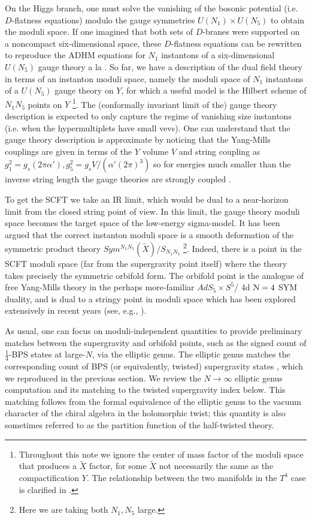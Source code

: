 \documentclass[../main.tex]{subfiles}
\begin{document}
On the Higgs branch, one must solve the vanishing of the bosonic potential (i.e. $D$-flatness equations) modulo the gauge symmetries $U(N_1)\times U(N_5)$ to obtain the moduli space. 
If one imagined that both sets of $D$-branes were supported on a noncompact six-dimensional space, these $D$-flatness equations can be rewritten to reproduce the ADHM equations for $N_1$ instantons of a six-dimensional $U(N_5)$ gauge theory a la \cite{WittenADHM}. So far, we have a description of the dual field theory in terms of an instanton moduli space, namely the moduli space of $N_1$ instantons of a $U(N_5)$ gauge theory on $Y$, for which a useful model is the Hilbert scheme of $N_1 N_5$ points on $Y$ \footnote{Throughout this note we ignore the center of mass factor of the moduli space that produces a $\tilde{X}$ factor, for some $\tilde{X}$ not necessarily the same as the compactification $Y$. The relationship between the two manifolds in the $T^4$ case is clarified in \cite{GiveonKutasovSeiberg}.}. The (conformally invariant limit of the) gauge theory description is expected to only capture the regime of vanishing size instantons (i.e. when the hypermultiplets have small vevs). One can understand that the gauge theory description is approximate by noticing that the Yang-Mills couplings are given in terms of the $Y$ volume $V$ and string coupling as $g_1^2 = g_s (2 \pi \alpha'), g_5^2 = g_s V/(\alpha' (2\pi)^3)$ so for energies much smaller than the inverse string length the gauge theories are strongly coupled \cite{Davidetal}. 


To get the SCFT we take an IR limit, which would be dual to a near-horizon limit from the closed string point of view. In this limit, the gauge theory moduli space becomes the target space of the low-energy sigma-model. It has been argued that the correct instanton moduli space is a smooth deformation of the symmetric product theory $Sym^{N_1 N_5}(\tilde{X})/S_{N_1 N_5}$ \footnote{Here we are taking both $N_1, N_5$ large.}. Indeed, there is a point in the SCFT moduli space (far from the supergravity point itself) where the theory takes precisely the symmetric orbifold form. The orbifold point is the analogue of free Yang-Mills theory in the perhaps more-familiar $AdS_5\times S^5$/ 4d $\mathcal N =4$ SYM duality, and is dual to a stringy point in moduli space which has been explored extensively in recent years (see, e.g., \cite{Eberhardt:2021vsx, Eberhardt:2019ywk, Eberhardt:2018ouy}).

As usual, one can focus on moduli-independent quantities to provide preliminary matches between the supergravity and orbifold points, such as the signed count of $\frac14$-BPS states at large-$N$, via the elliptic genus. The elliptic genus matches the corresponding count of BPS (or equivalently, twisted) supergravity states \cite{deBoerEG}, which we reproduced in the previous section. We review the $N\to \infty$ elliptic genus computation and its matching to the twisted supergravity index below. This matching follows from the formal equivalence of the elliptic genus to the vacuum character of the chiral algebra in the holomorphic twist; this quantity is also sometimes referred to as the partition function of the half-twisted theory. 
\end{document}
